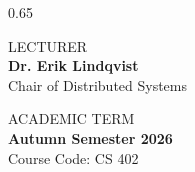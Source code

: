 \documentclass[aspectratio=169, 10pt]{beamer}
\begin{document}
\begin{frame}[plain]
\begin{columns}[c]
\begin{column}{0.65\textwidth}
      \begin{minipage}{0.48\textwidth}
        {\color{NordicGray}\tiny LECTURER}\\[1pt]
        {\color{NordicDark}\bfseries\scriptsize Dr. Erik Lindqvist}\\[1pt]
        {\color{NordicGray}\tiny Chair of Distributed Systems}
      \end{minipage}
      \begin{minipage}{0.48\textwidth}
        {\color{NordicGray}\tiny ACADEMIC TERM}\\[1pt]
        {\color{NordicDark}\bfseries\scriptsize Autumn Semester 2026}\\[1pt]
        {\color{NordicGray}\tiny Course Code: CS 402}
      \end{minipage}
    \end{column}
  \end{columns}
\end{frame}
\end{document}
